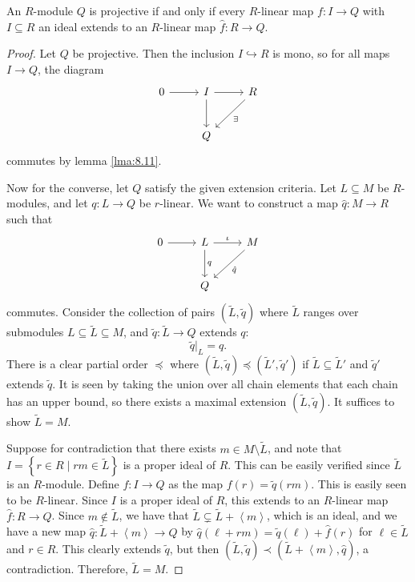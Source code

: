 \begin{theorem}\label{thm:8.1}
	An $R$-module $Q$ is projective if and only if every $R$-linear map $f : I \to Q$ with $I\subseteq R$ an ideal extends to an $R$-linear map $\hat{f} : R \to Q$.
\end{theorem}
\begin{proof}
	Let $Q$ be projective. Then the inclusion $I\hookrightarrow R$ is mono, so for all maps $I\to Q$, the diagram
	\[\begin{tikzcd}[row sep = 2.5em, column sep = 2.5em]
		0\arrow[r]&I\arrow[d]\arrow[r]&R\arrow[dl, "\exists "]\\
			  &Q
	\end{tikzcd}\]
	commutes by lemma \ref{lma:8.11}.

	Now for the converse, let $Q$ satisfy the given extension criteria. Let $L\subseteq M$ be $R$-modules, and let $q : L \to Q$ be $r$-linear. We want to construct a map $\hat{q} : M \to R$ such that
	\[\begin{tikzcd}[row sep = 2.5em, column sep = 2.5em]
		0\arrow[r]&L\arrow[r, "\iota "]\arrow[d, "q"]&M\arrow[dl, " \hat{q} "]\\
			  &Q
	\end{tikzcd}\]
	commutes. Consider the collection of pairs $\left( \widetilde{L} , \widetilde{q}  \right) $ where $\widetilde{L} $ ranges over submodules $L \subseteq \widetilde{L} \subseteq M$, and $\widetilde{q} : \widetilde{L}  \to Q$ extends $q$:
	\[
		\widetilde{q}|_L=q
	.\]
	There is a clear partial order $\preceq$ where $\left( \widetilde{L}, \widetilde{q}  \right) \preceq \left( \widetilde{L} ', \widetilde{q} ' \right) $ if $\widetilde{L} \subseteq \widetilde{L} '$ and $\widetilde{q} '$ extends $\widetilde{q} $. It is seen by taking the union over all chain elements that each chain has an upper bound, so there exists a maximal extension $\left( \widetilde{L} ,\widetilde{q}  \right) $. It suffices to show $\widetilde{L} =M$.

	Suppose for contradiction that there exists $m\in M\setminus \widetilde{L} $, and note that $I=\left\{ r\in R\mid r m\in \widetilde{L}  \right\} $ is a proper ideal of $R$. This can be easily verified since $\widetilde{L} $ is an $R$-module. Define $f : I \to Q$ as the map $f(r)=\widetilde{q} (r m)$. This is easily seen to be $R$-linear. Since $I$ is a proper ideal of $R$, this extends to an $R$-linear map $\hat{f} : R \to Q$. Since $m\notin \widetilde{L} $, we have that $\widetilde{L} \subsetneq \widetilde{L} +\left\langle m \right\rangle $, which is an ideal, and we have a new map $\hat{q} : \widetilde{L} +\left\langle m \right\rangle  \to Q$ by $\hat{q} (\ell + r m)=\widetilde{q} (\ell )+\hat{f} (r)$ for $\ell \in \widetilde{L} $ and $r\in R$. This clearly extends $\widetilde{q} $, but then $(\widetilde{L} ,\widetilde{q} )\prec (\widetilde{L} +\left\langle m \right\rangle ,\hat{q} )$, a contradiction. Therefore, $\widetilde{L} =M$.
\end{proof}

